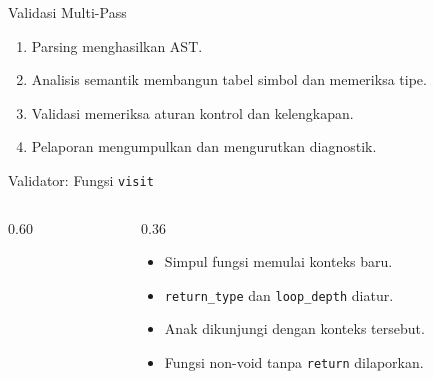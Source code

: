 \documentclass[aspectratio=169,10pt,t]{beamer}
\begin{document}
\begin{frame}{Validasi Multi-Pass}
  \begin{center}
  \end{center}

  \begin{enumerate}
    \setlength{\itemsep}{1pt}
    \item Parsing menghasilkan AST.
    \item Analisis semantik membangun tabel simbol dan memeriksa tipe.
    \item Validasi memeriksa aturan kontrol dan kelengkapan.
    \item Pelaporan mengumpulkan dan mengurutkan diagnostik.
  \end{enumerate}
\end{frame}

\begin{frame}[fragile]{Validator: Fungsi \texttt{visit}}
  \begin{columns}[T,onlytextwidth]
    \begin{column}{0.60\textwidth}
      
    \end{column}
    \begin{column}{0.36\textwidth}
      \begin{itemize}
        \item Simpul fungsi memulai konteks baru.
        \item \texttt{return\_type} dan \texttt{loop\_depth} diatur.
        \item Anak dikunjungi dengan konteks tersebut.
        \item Fungsi non-void tanpa \texttt{return} dilaporkan.
      \end{itemize}
    \end{column}
  \end{columns}
\end{frame}
\end{document}
